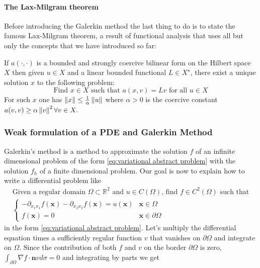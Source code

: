 \paragraph{The Lax-Milgram theorem}
Before introducing the Galerkin method the last thing to do is to state the famous Lax-Milgram theorem, a result of functional analysis that uses all but only the concepts that we have introduced so far:
\vspace{0.5cm}
\begin{theorem}
	If \(a(\cdot, \cdot)\) is a bounded and strongly coercive bilinear form on the Hilbert space \(X\) then given \(u \in X\) and a linear bounded functional $L\in X^\star$, there exist a unique solution $x$ to the following problem:
	\begin{equation}\label{eq:variational abstract problem}
	\text{Find }x\in X\text{ such that } a(x, v)=Lv \text{ for all } u \in X
	\end{equation}
	For such \(x\) one has \(\|x\| \leq \frac{1}{\alpha}\left\lVert u\right\rVert\) where \(\alpha>0\) is the coercive constant \(a(v, v) \geq \alpha\left\lVert v\right\rVert^{2} \forall v \in X.\)
\end{theorem} 
\vspace{0.5cm}
\subsubsection{Weak formulation of a PDE and Galerkin Method}

Galerkin's method is a method to approximate the solution $f$ of an infinite dimensional problem of the form \ref{eq:variational abstract problem} with the solution $f_h$ of a finite dimensional problem. Our goal is now to explain how to write a differential problem like 
\begin{align}\label{eq:strong form}
\text{Given a regular domain }\Omega\subset\mathbb R^2\text{ and } u\in C(\Omega)\text{, find }f\in C^2(\Omega) \text{ such that}\\
\begin{cases}
-\partial_{x_1x_1}f(\mathbf x) - \partial_{x_2x_2}f(\mathbf x) = u(\mathbf x) & \mathbf x \in \Omega\\
f(\mathbf x) =  0& \mathbf x \in \partial \Omega
\end{cases}
\end{align}
in the form \ref{eq:variational abstract problem}. Let's multiply the differential equation times a sufficiently regular function $v$ that vanishes on $\partial \Omega$ and integrate on $\Omega$. Since the contribution of both $f$ and $v$ on the border $\partial \Omega$ is zero, $\int_{\partial \Omega}\nabla f \cdot \mathbf nv d\sigma=0$ and integrating by parts we get

